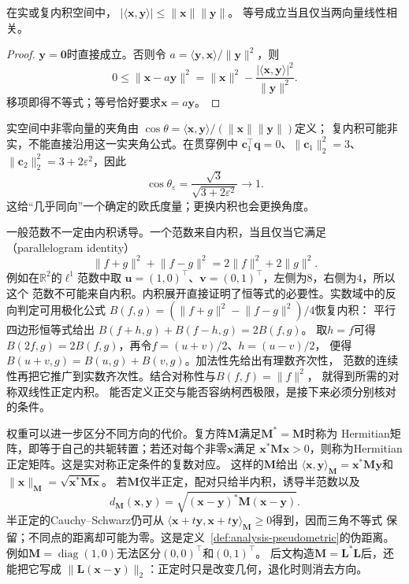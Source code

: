 \begin{theorem}
\label{thm:linear-algebra-cauchy-schwarz}
在实或复内积空间中，
$|\langle\bm x,\bm y\rangle|\leq\lVert\bm x\rVert\lVert\bm y\rVert$。
等号成立当且仅当两向量线性相关。
\end{theorem}
\begin{proof}
$\bm y=\bm0$时直接成立。否则令
$a=\langle\bm y,\bm x\rangle/\lVert\bm y\rVert^2$，则
\[
 0\leq\lVert\bm x-a\bm y\rVert^2
 =\lVert\bm x\rVert^2-
   \frac{|\langle\bm x,\bm y\rangle|^2}{\lVert\bm y\rVert^2}.
\]
移项即得不等式；等号恰好要求$\bm x=a\bm y$。
\end{proof}

实空间中非零向量的夹角由
$\cos\theta=\langle\bm x,\bm y\rangle/(\lVert\bm x\rVert\lVert\bm y\rVert)$定义；
复内积可能非实，不能直接沿用这一实夹角公式。在贯穿例中
$\bm c_1^\top\bm q=0$、$\lVert\bm c_1\rVert_2^2=3$、
$\lVert\bm c_2\rVert_2^2=3+2\varepsilon^2$，因此
\begin{equation}
 \cos\theta_\varepsilon=\frac{\sqrt3}{\sqrt{3+2\varepsilon^2}}\longrightarrow1.
 \label{eq:linear-algebra-nearly-collinear-angle}
\end{equation}
这给“几乎同向”一个确定的欧氏度量；更换内积也会更换角度。


一般范数不一定由内积诱导。一个范数来自内积，当且仅当它满足
（parallelogram identity）
\begin{equation}
  \lVert f+g\rVert^2+\lVert f-g\rVert^2
  =
  2\lVert f\rVert^2+2\lVert g\rVert^2.
  \label{eq:functional-parallelogram-identity}
\end{equation}
例如在$\mathbb{R}^2$的$\ell^1$范数中取
$\bm{u}=(1,0)^{\top}$、$\bm{v}=(0,1)^{\top}$，左侧为$8$，右侧为$4$，所以这个
范数不可能来自内积。内积展开直接证明了恒等式的必要性。实数域中的反向判定可用极化公式
$B(f,g)=(\lVert f+g\rVert^2-\lVert f-g\rVert^2)/4$恢复内积：
平行四边形恒等式给出
$B(f+h,g)+B(f-h,g)=2B(f,g)$。
取$h=f$可得$B(2f,g)=2B(f,g)$，再令$f=(u+v)/2$、$h=(u-v)/2$，
便得$B(u+v,g)=B(u,g)+B(v,g)$。加法性先给出有理数齐次性，
范数的连续性再把它推广到实数齐次性。结合对称性与$B(f,f)=\lVert f\rVert^2$，
就得到所需的对称双线性正定内积。
能否定义正交与能否容纳柯西极限，是接下来必须分别核对的条件。


权重可以进一步区分不同方向的代价。复方阵$\bm M$满足$\bm M^*=\bm M$时称为
Hermitian矩阵，即等于自己的共轭转置；若还对每个非零$\bm x$满足
$\bm x^*\bm M\bm x>0$，则称为Hermitian正定矩阵。这是实对称正定条件的复数对应。
这样的$\bm M$给出
$\langle\bm x,\bm y\rangle_{\bm M}=\bm x^*\bm M\bm y$和
$\lVert\bm x\rVert_{\bm M}=\sqrt{\bm x^*\bm M\bm x}$。
若$\bm M$仅半正定，配对只给半内积，诱导半范数以及
\begin{equation}
 d_{\bm M}(\bm x,\bm y)
 =\sqrt{(\bm x-\bm y)^*\bm M(\bm x-\bm y)}.
 \label{eq:linear-algebra-mahalanobis-pseudodistance}
\end{equation}
半正定的Cauchy--Schwarz仍可从
$\langle\bm x+t\bm y,\bm x+t\bm y\rangle_{\bm M}\geq0$得到，因而三角不等式
保留；不同点的距离却可能为零。这是定义~\ref{def:analysis-pseudometric}的伪距离。
例如$\bm M=\operatorname{diag}(1,0)$无法区分$(0,0)^\top$和$(0,1)^\top$。
后文构造$\bm M=\bm L^*\bm L$后，还能把它写成
$\lVert\bm L(\bm x-\bm y)\rVert_2$：正定时只是改变几何，退化时则消去方向。

